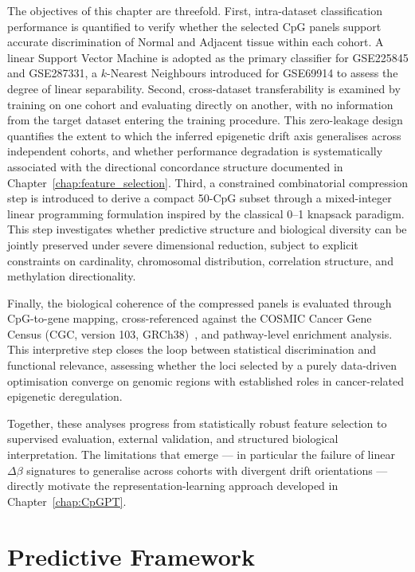 The objectives of this chapter are threefold. First, intra-dataset 
classification performance is quantified to verify whether the selected CpG 
panels support accurate discrimination of Normal and Adjacent tissue within 
each cohort. A linear Support Vector Machine is adopted as the primary 
classifier for GSE225845 and GSE287331, a $k$-Nearest Neighbours introduced for 
GSE69914 to assess the degree of linear separability. Second, cross-dataset 
transferability is examined by training on one cohort and evaluating directly 
on another, with no information from the target dataset entering the training 
procedure. This zero-leakage design quantifies the extent to which the inferred 
epigenetic drift axis generalises across independent cohorts, and whether 
performance degradation is systematically associated with the directional 
concordance structure documented in Chapter~\ref{chap:feature_selection}. 
Third, a constrained combinatorial compression step is introduced to derive a 
compact 50-CpG subset through a mixed-integer linear programming formulation 
inspired by the classical 0--1 knapsack paradigm. This step investigates 
whether predictive structure and biological diversity can be jointly preserved 
under severe dimensional reduction, subject to explicit constraints on 
cardinality, chromosomal distribution, correlation structure, and 
methylation directionality.

Finally, the biological coherence of the compressed panels is evaluated through 
CpG-to-gene mapping, cross-referenced against the COSMIC Cancer Gene Census (CGC, version 103, GRCh38)~\cite{sondka2018cosmic,cosmic_cgc_v103}, 
and pathway-level enrichment analysis. This interpretive step closes the loop 
between statistical discrimination and functional relevance, assessing whether 
the loci selected by a purely data-driven optimisation converge on genomic 
regions with established roles in cancer-related epigenetic deregulation.

Together, these analyses progress from statistically robust feature selection 
to supervised evaluation, external validation, and structured biological 
interpretation. The limitations that emerge — in particular the failure of 
linear $\Delta\beta$ signatures to generalise across cohorts with divergent 
drift orientations — directly motivate the representation-learning approach 
developed in Chapter~\ref{chap:CpGPT}.

\section{Predictive Framework}

